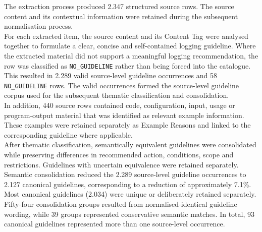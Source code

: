 The extraction process produced 2.347 structured source rows. The source
content and its contextual information were retained during the subsequent
normalisation process.
\\
For each extracted item, the source content and its Content Tag were analysed
together to formulate a clear, concise and self-contained logging guideline.
Where the extracted material did not support a meaningful logging recommendation,
the row was classified as \texttt{NO\_GUIDELINE} rather than being forced into the
catalogue.
\\
This resulted in 2.289 valid source-level guideline occurrences and 58
\texttt{NO\_GUIDELINE} rows. The valid occurrences formed the source-level
guideline corpus used for the subsequent thematic classification and consolidation.
\\
In addition, 440 source rows contained code, configuration, input, usage or
program-output material that was identified as relevant example information.
These examples were retained separately as Example Reasons and linked to the
corresponding guideline where applicable.
\\
After thematic classification, semantically equivalent guidelines were consolidated
while preserving differences in recommended action, conditions, scope and
restrictions. Guidelines with uncertain equivalence were retained separately.
\\
Semantic consolidation reduced the 2.289 source-level guideline occurrences to
2.127 canonical guidelines, corresponding to a reduction of approximately 7.1\%.
Most canonical guidelines (2.034) were unique or deliberately retained separately.
Fifty-four consolidation groups resulted from normalised-identical guideline wording,
while 39 groups represented conservative semantic matches. In total, 93 canonical
guidelines represented more than one source-level occurrence.

